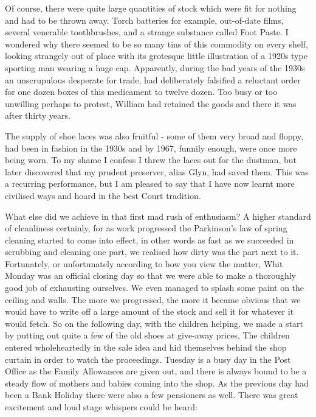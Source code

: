 Of course, there were quite large quantities of stock which were fit for nothing and had to be thrown away. Torch batteries for example, out-of-date films, several venerable toothbrushes, and a strange substance called  Foot Paste. I wondered why there seemed to be so many tins of this commodity on every shelf, looking strangely out of place with its grotesque little illustration of a 1920s type sporting man wearing a huge cap. Apparently, during the bad years of the 1930s an unscrupulous  desperate for trade, had deliberately falsified a reluctant order for one dozen boxes of this medicament to twelve dozen. Too busy or too unwilling perhaps to protest, William had retained the goods and there it was after thirty years.

The supply of shoe laces was also fruitful - some of them very broad and floppy, had been in fashion in the 1930s and by 1967, funnily enough, were once more being worn. To my shame I confess I threw the laces out for the dustman, but later discovered that my prudent preserver, alias Glyn, had saved them. This was a recurring performance, but I am pleased to say that I have now learnt more civilised ways and hoard in the best Court tradition.

What else did we achieve in that first mad rush of enthusiasm? A higher standard of cleanliness certainly, for as work progressed the Parkinson's law of spring cleaning started to come into effect, in other words as fast as we succeeded in scrubbing and cleaning one part, we realised how dirty was the part next to it. Fortunately, or unfortunately according to how you view the matter, Whit Monday was an official closing day so that we were able to make a thoroughly good job of exhausting ourselves. We even managed to splash some paint on the ceiling and walls. The more we progressed, the more it became obvious that we would have to write off a large amount of the stock and sell it for whatever it would fetch. So on the following day, with the children helping, we made a start by putting out quite a few of the old shoes at give-away prices, The children entered wholeheartedly in the sale idea and hid themselves behind the shop curtain in order to watch the proceedings. Tuesday is a busy day in the Post Office as the Family Allowances are given out, and there is always bound to be a steady flow of mothers and babies coming into the shop. As the previous day had been a Bank Holiday there were also a few pensioners as well. There was great excitement and loud stage whispers could be heard:

